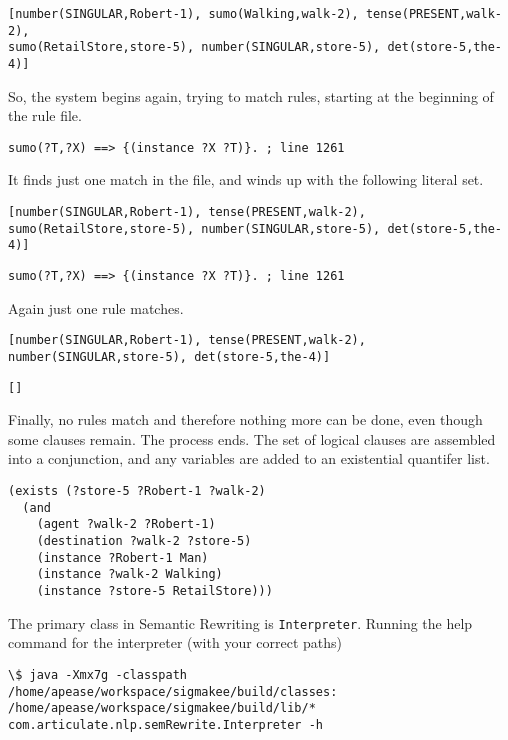 \documentclass{book}
\begin{document}
\begin{verbatim}
[number(SINGULAR,Robert-1), sumo(Walking,walk-2), tense(PRESENT,walk-2), 
sumo(RetailStore,store-5), number(SINGULAR,store-5), det(store-5,the-4)]
\end{verbatim}

So, the system begins again, trying to match rules, starting at the 
beginning of the rule file.

\begin{verbatim}
sumo(?T,?X) ==> {(instance ?X ?T)}. ; line 1261
\end{verbatim}

It finds just one match in the file, and winds up with the following
literal set.

\begin{verbatim}
[number(SINGULAR,Robert-1), tense(PRESENT,walk-2), 
sumo(RetailStore,store-5), number(SINGULAR,store-5), det(store-5,the-4)]
\end{verbatim}

\begin{verbatim}
sumo(?T,?X) ==> {(instance ?X ?T)}. ; line 1261
\end{verbatim}

Again just one rule matches.

\begin{verbatim}
[number(SINGULAR,Robert-1), tense(PRESENT,walk-2), 
number(SINGULAR,store-5), det(store-5,the-4)]
\end{verbatim}

\begin{verbatim}
[]
\end{verbatim}

Finally, no rules match and therefore nothing more can be done, even 
though some clauses remain.  The process ends.  The set of logical
clauses are assembled into a conjunction, and any variables are added
to an existential quantifer list.

\begin{verbatim}
(exists (?store-5 ?Robert-1 ?walk-2) 
  (and 
    (agent ?walk-2 ?Robert-1)
    (destination ?walk-2 ?store-5)
    (instance ?Robert-1 Man)
    (instance ?walk-2 Walking)
    (instance ?store-5 RetailStore))) 
\end{verbatim}

The primary class in Semantic Rewriting is
\texttt{Interpreter}. Running the help command for
the interpreter (with your correct paths)

\begin{verbatim}
\$ java -Xmx7g -classpath /home/apease/workspace/sigmakee/build/classes:
/home/apease/workspace/sigmakee/build/lib/*  
com.articulate.nlp.semRewrite.Interpreter -h
\end{verbatim}
\end{document}
